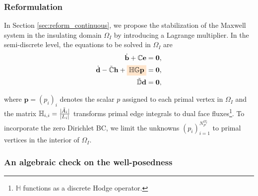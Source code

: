 \documentclass{article}
\begin{document}
\subsubsection{Reformulation} \label{sec:reform_discrete}
In Section \ref{sec:reform_continuous}, we propose the stabilization of the Maxwell system in the insulating domain $\Omega_I$ by introducing a Lagrange multiplier. In the semi-discrete level, the equations to be solved in $\Omega_I$ are
\begin{subequations}
    \begin{align}
        \dot{\mathbf{b}} + \mathbb{C}\mathbf{e} &= \mathbf{0} ,\\
        \dot{\mathbf{d}} - \Tilde{\mathbb{C}}\mathbf{h} + \colorbox{orange!20}{$\mathbb{H} \mathbb{G} \mathbf{p}$}&= \mathbf{0},\\
        \Tilde{\mathbb{D}}\mathbf{d} &= \mathbf{0} \label{equ:discrete_zero_div}, 
    \end{align} 
\end{subequations}

where $\mathbf{p} = (p_i)_i$ denotes the scalar $p$ assigned to each primal vertex in $\Omega_I$ and the matrix $\mathbb{H}_{i,i} = \frac{|\Tilde{A}_i|}{|L_i|}$ transforms primal edge integrals to dual face fluxes\footnote{$\mathbb{H}$ functions as a discrete Hodge operator.}. To incorporate the zero Dirichlet BC, we limit the unknowns $(p_i)_{i=1}^{N^{\Omega^\circ_I}_P}$ to primal vertices in the interior of $\Omega_I$.

\subsubsection{An algebraic check on the well-posedness}
\end{document}
